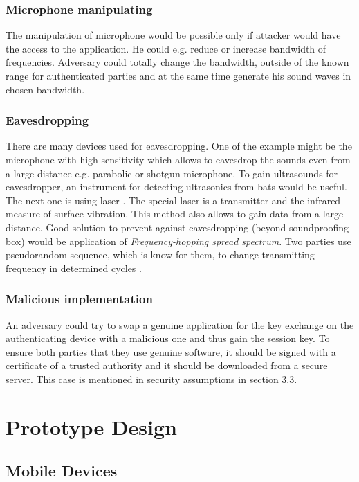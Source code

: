 \documentclass[11pt,titlepage]{article}
\theoremstyle{plain}
\begin{document}
\subsubsection{Microphone manipulating}
The manipulation of microphone would be possible only if attacker would have the access to the application. He could e.g. reduce or increase bandwidth of frequencies. Adversary could totally change the bandwidth, outside of the known range for authenticated parties and at the same time generate his sound waves in chosen bandwidth.

\subsubsection{Eavesdropping}
There are many devices used for eavesdropping. One of the example might be the microphone with high sensitivity which allows to eavesdrop the sounds even from a large distance e.g. parabolic or shotgun  microphone. To gain ultrasounds for eavesdropper, an instrument for detecting ultrasonics from bats would be useful. The next one is using laser \cite{laser_mic}. The special laser is a transmitter and the infrared measure of surface vibration. This method also allows to gain data from a large distance. Good solution to prevent against eavesdropping (beyond soundproofing box) would be application of \textit{Frequency-hopping spread spectrum}. Two parties use pseudorandom sequence, which is know for them, to change transmitting frequency in determined cycles \cite{fhss}.

\subsubsection{Malicious implementation}
An adversary could try to swap a genuine application for the key exchange on the authenticating device with a malicious one and thus gain the session key. To ensure both parties that they use genuine software, it should be signed with a certificate of a trusted authority and it should be downloaded from a secure server. This case is mentioned in security assumptions in section 3.3.



\section{Prototype Design}
\subsection{Mobile Devices}
\end{document}
